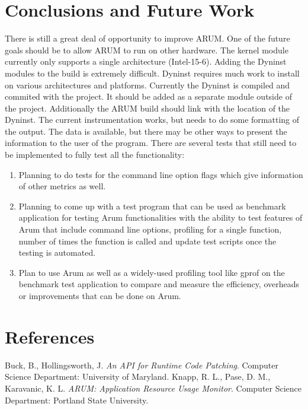 \documentclass[11pt,letterpaper,oneside]{article}
\begin{document}
\section{Conclusions and Future Work}
There is still a great deal of opportunity to improve ARUM.   One of the future goals should be to allow ARUM to run on other hardware.  The kernel module currently only supports a single architecture (Intel-15-6).  Adding the Dyninst modules to the build is extremely difficult.  Dyninst requires much work to install on various architectures and platforms.   Currently the Dyninst is compiled and commited with the project.  It should be added as a separate module outside of the project.  Additionally the ARUM build should link with the location of the Dyninst.
\newline
The current instrumentation works, but needs to do some formatting of the output.  The data is available, but there may be other ways to present the information to the user of the program.
\newline
There are several tests that still need to be implemented to fully test all the functionality:
\begin{enumerate}
\item Planning to do tests for the command line option flags which give information of other metrics as well. 
\item Planning to come up with a test program that can be used as benchmark application for testing Arum functionalities with the ability to test features of Arum that include command line options, profiling for a single function, number of times the function is called and update test scripts once the	testing is automated.
\item Plan to use Arum as well as a widely-used profiling tool like gprof on the benchmark test application to compare and measure the efficiency,	overheads or improvements that can be done on Arum. 
\end{enumerate}

\section{References}
\begin{thebibliography}{9}
Buck, B., Hollingsworth, J. \emph{An API for Runtime Code Patching}. Computer Science Department: University of Maryland. 
Knapp, R. L., Pase, D. M., Karavanic, K. L. \emph{ARUM: Application Resource Usage Monitor}.  Computer Science Department:  Portland State University.
\end{thebibliography}
\end{document}
